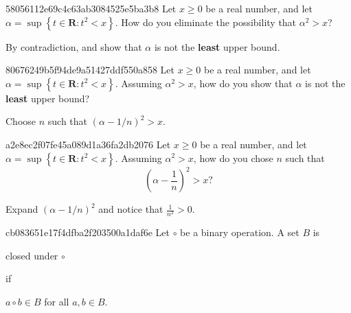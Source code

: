 \begin{note}{58056112e69c4c63ab3084525e5ba3b8}
    Let \({ x \geq 0 }\) be a real number, and let \({ \alpha = \sup \left\{ t \in \mathbf{R} : t^2 < x \right\} }\).
    How do you eliminate the possibility that \({ \alpha^2 > x }\)?

    \begin{cloze}{1}
        By contradiction, and show that \({ \alpha }\) is not the \textbf{least} upper bound.
    \end{cloze}
\end{note}

\begin{note}{80676249b5f94de9a51427ddf550a858}
    Let \({ x \geq 0 }\) be a real number, and let \({ \alpha = \sup \left\{ t \in \mathbf{R} : t^2 < x \right\} }\).
    Assuming \({ \alpha^2 > x }\), how do you show that \({ \alpha }\) is not the \textbf{least} upper bound?

    \begin{cloze}{1}
        Choose \({ n }\) such that \({ \left( \alpha - 1/n \right)^2 > x }\).
    \end{cloze}
\end{note}

\begin{note}{a2e8ec2f07fe45a089d1a36fa2db2076}
    Let \({ x \geq 0 }\) be a real number, and let \({ \alpha = \sup \left\{ t \in \mathbf{R} : t^2 < x \right\} }\).
    Assuming \({ \alpha^2 > x }\), how do you chose \({ n }\) such that
    \[
            \left( \alpha - \frac{1}{n} \right)^2 > x?
    \]

    \begin{cloze}{1}
        Expand \({ \left( \alpha - 1/n \right)^2 }\) and notice that \({ \frac{1}{n^2} > 0 }\).
    \end{cloze}
\end{note}

\begin{note}{cb083651e17f4dfba2f203500a1daf6e}
    Let \({ \circ }\) be a binary operation. A set \({ B }\) is \begin{icloze}{2}closed under \({ \circ }\)\end{icloze} if
    \begin{icloze}{1}
        \begin{center}
            \({ a \circ b \in B }\) for all \({ a, b \in B }\).
        \end{center}
    \end{icloze}
\end{note}

